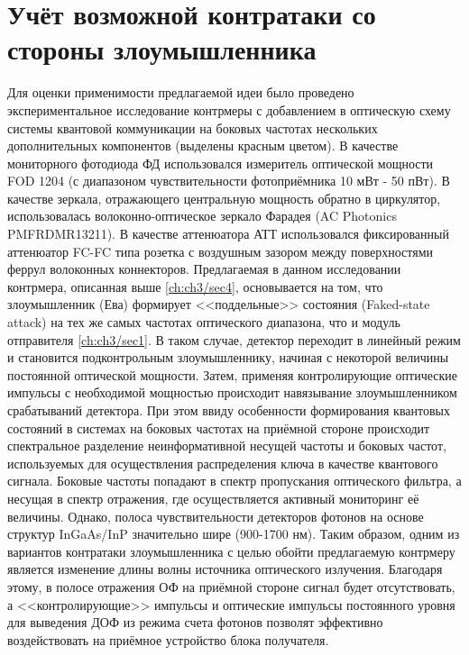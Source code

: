 \pagebreak


\section{Учёт возможной контратаки со стороны злоумышленника}\label{ch:ch3/sec7}

Для оценки применимости предлагаемой идеи было проведено экспериментальное исследование контрмеры с добавлением в оптическую схему системы квантовой коммуникации на боковых частотах нескольких дополнительных компонентов (выделены красным цветом). В качестве мониторного фотодиода ФД использовался измеритель оптической мощности FOD 1204 (с диапазоном чувствительности фотоприёмника 10 мВт - 50 пВт). В качестве зеркала, отражающего центральную мощность обратно в циркулятор, использовалась волоконно-оптическое зеркало Фарадея (AC Photonics PMFRDMR13211). В качестве аттенюатора АТТ использовался фиксированный аттенюатор FC-FC типа розетка с воздушным зазором между поверхностями феррул волоконных коннекторов. Предлагаемая в данном исследовании контрмера, описанная выше \ref{ch:ch3/sec4}, основывается на том, что злоумышленник (Ева) формирует <<поддельные>> состояния (Faked-state attack) на тех же самых частотах оптического диапазона, что и модуль отправителя \ref{ch:ch3/sec1}. В таком случае, детектор переходит в линейный режим и становится подконтрольным злоумышленнику, начиная с некоторой величины постоянной оптической мощности. Затем, применяя контролирующие оптические импульсы с необходимой мощностью происходит навязывание злоумышленником срабатываний детектора. При этом ввиду особенности формирования квантовых состояний в системах на боковых частотах на приёмной стороне происходит спектральное разделение неинформативной несущей частоты и боковых частот, используемых для осуществления распределения ключа в качестве квантового сигнала. Боковые частоты попадают в спектр пропускания оптического фильтра, а несущая в спектр отражения, где осуществляется активный мониторинг её величины. Однако, полоса чувствительности детекторов фотонов на основе структур InGaAs/InP значительно шире (900-1700 нм). Таким образом, одним из вариантов контратаки злоумышленника с целью обойти предлагаемую контрмеру является изменение длины волны источника оптического излучения. Благодаря этому, в полосе отражения ОФ на приёмной стороне сигнал будет отсутствовать, а <<контролирующие>> импульсы и оптические импульсы постоянного уровня для выведения ДОФ из режима счета фотонов позволят эффективно воздействовать на приёмное устройство блока получателя.
